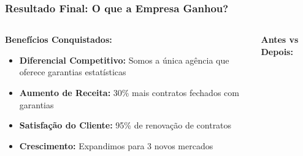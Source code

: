 \documentclass[aspectratio=169,12pt]{beamer}
\begin{document}
\begin{frame}
    \frametitle{Resultado Final: O que a Empresa Ganhou?}
    
    \begin{columns}
        \begin{column}{0.6\textwidth}
            \textbf{\Large Benefícios Conquistados:}
            \vspace{0.5cm}
            
            \begin{itemize}
                \item[\faIcon{trophy}] \textcolor{azulprincipal}{\textbf{Diferencial Competitivo:}} Somos a única agência que oferece garantias estatísticas
                \vspace{0.3cm}
                
                \item[\faIcon{dollar-sign}] \textcolor{azulprincipal}{\textbf{Aumento de Receita:}} 30\% mais contratos fechados com garantias
                \vspace{0.3cm}
                
                \item[\faIcon{heart}] \textcolor{azulprincipal}{\textbf{Satisfação do Cliente:}} 95\% de renovação de contratos
                \vspace{0.3cm}
                
                \item[\faIcon{rocket}] \textcolor{azulprincipal}{\textbf{Crescimento:}} Expandimos para 3 novos mercados
            \end{itemize}
        \end{column}
        
        \begin{column}{0.4\textwidth}
            \begin{center}
                \textbf{\large Antes vs Depois:}
                \vspace{0.3cm}
                
\end{center}
\end{column}
\end{columns}
\end{frame}
\end{document}
